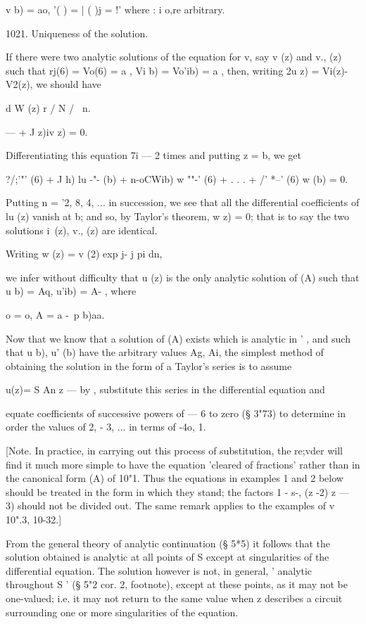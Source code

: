 v b) = ao, '( ) = | ( )j = !' where : i o,re arbitrary.

1021. Uniqueness of the solution.

If there were two analytic solutions of the equation for v, say v (z)
and v., (z) such that rj(6) = Vo(6) = a , Vi b) = Vo'ib) = a , then,
writing 2u z) = Vi(z)-V2(z), we should have

d W (z) r / N / \ n.

— + J z)iv z) = 0.

Differentiating this equation 7i — 2 times and putting z = b, we get

?/;'"' (6) + J h) lu -"- (b) + n-oCWib) w ""-' (6) + . . . + /' *--'
(6) w (b) = 0.

Putting n = '2, 8, 4, ... in succession, we see that all the
differential coefficients of lu (z) vanish at b; and so, by Taylor's
theorem, w z) = 0; that is to say the two solutions i\ (z), v., (z)
are identical.

Writing w (z) = v (2) exp j- j pi dn,

we infer without difficulty that u (z) is the only analytic solution
of (A) such that u b) = Aq, u'ib) = A- , where

 o = o, A = a -\ p b)aa.

Now that we know that a solution of (A) exists which is analytic in '
, and such that u b), u' (b) have the arbitrary values Ag, Ai, the
simplest method of obtaining the solution in the form of a Taylor's
series is to assume

u(z)= S An z — by , substitute this series in the differential
equation and

equate coefficients of successive powers of — 6 to zero (§ 3"73) to
determine in order the values of 2, - 3, ... in terms of -4o, 1.

[Note. In practice, in carrying out this process of substitution, the
re;vder will find it much more simple to have the equation 'cleared of
fractions' rather than in the canonical form (A) of 10"1. Thus the
equations in examples 1 and 2 below should be treated in the form in
which they stand; the factors 1 - s-, (z -2) z — 3) should not be
divided out. The same remark applies to the examples of v 10".3,
10-32.]

From the general theory of analytic continuation (§ 5*5) it follows
that the solution obtained is analytic at all points of S except at
singularities of the differential equation. The solution however is
not, in general, ' analytic throughout S ' (§ 5"2 cor. 2, footnote),
except at these points, as it may not be one-valued; i.e. it may not
return to the same value when z describes a circuit surrounding one or
more singularities of the equation.

